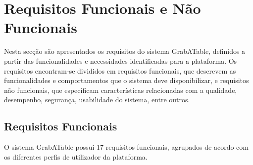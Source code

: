 \section{Requisitos Funcionais e Não Funcionais}

Nesta secção são apresentados os requisitos do sistema GrabATable, definidos a partir das funcionalidades e necessidades identificadas para a plataforma. Os requisitos encontram-se divididos em requisitos funcionais, que descrevem as funcionalidades e comportamentos que o sistema deve disponibilizar, e requisitos não funcionais, que especificam características relacionadas com a qualidade, desempenho, segurança, usabilidade do sistema, entre outros.

\subsection{Requisitos Funcionais}
\label{chap:rf}

O sistema GrabATable possui 17 requisitos funcionais, agrupados de acordo com os diferentes perfis de utilizador da plataforma.


